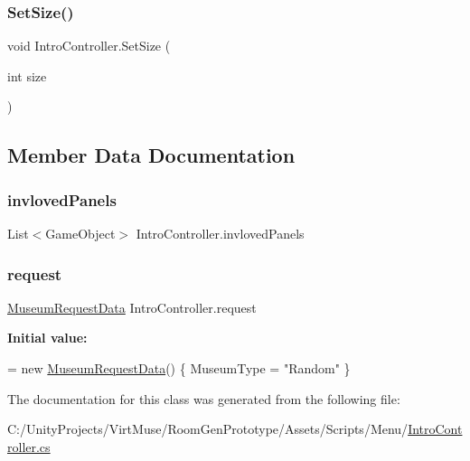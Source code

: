 \subsubsection{\texorpdfstring{Set\+Size()}{SetSize()}}
{\footnotesize\ttfamily void Intro\+Controller.\+Set\+Size (\begin{DoxyParamCaption}\item[{int}]{size }\end{DoxyParamCaption})}



\subsection{Member Data Documentation}
\mbox{\label{class_intro_controller_aa4a4ba4580a40af426f5b210a0c13617}} 
\subsubsection{\texorpdfstring{invloved\+Panels}{invlovedPanels}}
{\footnotesize\ttfamily List$<$Game\+Object$>$ Intro\+Controller.\+invloved\+Panels\hspace{0.3cm}{\ttfamily [private]}}

\mbox{\label{class_intro_controller_a06727e6268f720c81ec061f6ff1faa88}} 
\subsubsection{\texorpdfstring{request}{request}}
{\footnotesize\ttfamily \mbox{\hyperlink{class_museum_request_data}{Museum\+Request\+Data}} Intro\+Controller.\+request\hspace{0.3cm}{\ttfamily [private]}}

{\bfseries Initial value\+:}
\begin{DoxyCode}
= \textcolor{keyword}{new} \mbox{\hyperlink{class_museum_request_data}{MuseumRequestData}}()
    \{
        MuseumType = \textcolor{stringliteral}{"Random"}
    \}
\end{DoxyCode}


The documentation for this class was generated from the following file\+:\begin{DoxyCompactItemize}
\item 
C\+:/\+Unity\+Projects/\+Virt\+Muse/\+Room\+Gen\+Prototype/\+Assets/\+Scripts/\+Menu/\mbox{\hyperlink{_intro_controller_8cs}{Intro\+Controller.\+cs}}\end{DoxyCompactItemize}
